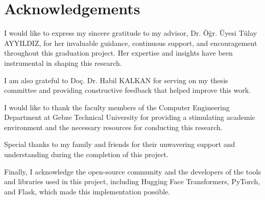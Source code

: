\chapter*{Acknowledgements}

I would like to express my sincere gratitude to my advisor, Dr. Öğr. Üyesi Tülay AYYILDIZ, for her invaluable guidance, continuous support, and encouragement throughout this graduation project. Her expertise and insights have been instrumental in shaping this research.

I am also grateful to Doç. Dr. Habil KALKAN for serving on my thesis committee and providing constructive feedback that helped improve this work.

I would like to thank the faculty members of the Computer Engineering Department at Gebze Technical University for providing a stimulating academic environment and the necessary resources for conducting this research.

Special thanks to my family and friends for their unwavering support and understanding during the completion of this project.

Finally, I acknowledge the open-source community and the developers of the tools and libraries used in this project, including Hugging Face Transformers, PyTorch, and Flask, which made this implementation possible.

\clearpage
